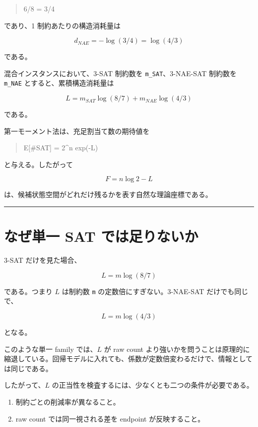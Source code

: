 \documentclass[12pt,a4paper]{article}
\begin{document}
\begin{quote}
\small
6/8 = 3/4
\end{quote}

であり、1 制約あたりの構造消耗量は

\[
d_{NAE} = -\log(3/4) = \log(4/3)
\]

である。

混合インスタンスにおいて、3-SAT 制約数を \texttt{m\_SAT}、3-NAE-SAT 制約数を \texttt{m\_NAE} とすると、累積構造消耗量は

\[
L = m_{SAT} \log(8/7) + m_{NAE} \log(4/3)
\]

である。

第一モーメント法は、充足割当て数の期待値を

\begin{quote}
\small
E[\#SAT] = 2\textasciicircum{}n exp(-L)
\end{quote}

と与える。したがって

\[
F = n \log 2 - L
\]

は、候補状態空間がどれだけ残るかを表す自然な理論座標である。

\begin{center}\rule{0.5\linewidth}{0.5pt}\end{center}

\section{なぜ単一 SAT では足りないか}\label{ux306aux305cux5358ux4e00-sat-ux3067ux306fux8db3ux308aux306aux3044ux304b}

3-SAT だけを見た場合、

\[
L = m \log(8/7)
\]

である。つまり $L$ は制約数 \texttt{m} の定数倍にすぎない。3-NAE-SAT だけでも同じで、

\[
L = m \log(4/3)
\]

となる。

このような単一 family では、$L$ が raw count より強いかを問うことは原理的に縮退している。回帰モデルに入れても、係数が定数倍変わるだけで、情報としては同じである。

したがって、$L$ の正当性を検査するには、少なくとも二つの条件が必要である。

\begin{enumerate}
\def\labelenumi{\arabic{enumi}.}
\tightlist
\item
  制約ごとの削減率が異なること。
\item
  raw count では同一視される差を endpoint が反映すること。
\end{enumerate}
\end{document}
